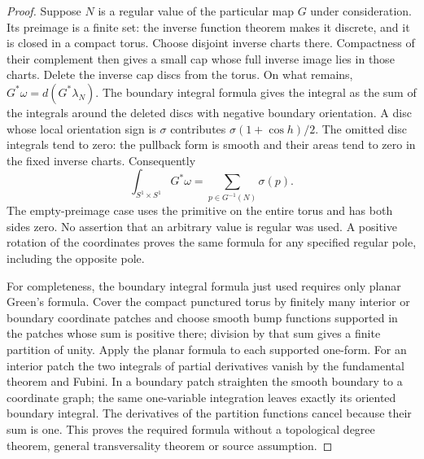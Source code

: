\begin{proof}
Suppose $N$ is a regular value of the particular map $G$ under
consideration. Its preimage is a finite set: the inverse function
theorem makes it discrete, and it is closed in a compact torus.
Choose disjoint inverse charts there. Compactness of their complement
then gives a small cap whose full inverse image lies in those charts.
Delete the inverse cap discs from the torus. On what remains,
$G^*\omega=d(G^*\lambda_N)$. The boundary integral formula gives
the integral as the sum of the integrals around the deleted discs
with negative boundary orientation. A disc whose local orientation
sign is $\sigma$ contributes $\sigma(1+\cos h)/2$.
The omitted disc integrals tend to zero: the pullback form is smooth
and their areas tend to zero in the fixed inverse charts. Consequently
\begin{equation}\label{fd:regular-pole-count}
                  \int_{S^1\times S^1}G^*\omega
                     =\sum_{p\in G^{-1}(N)}\sigma(p).
\end{equation}
The empty-preimage case uses the primitive on the entire torus and
has both sides zero. No assertion that an arbitrary value is regular
was used. A positive rotation of the coordinates proves the same
formula for any specified regular pole, including the opposite pole.

For completeness, the boundary integral formula just used requires
only planar Green's formula. Cover the compact punctured torus by
finitely many interior or boundary coordinate patches and choose
smooth bump functions supported in the patches whose sum is positive
there; division by that sum gives a finite partition of unity.
Apply the planar formula to each supported one-form. For an interior
patch the two integrals of partial derivatives vanish by the
fundamental theorem and Fubini. In a boundary patch straighten the
smooth boundary to a coordinate graph; the same one-variable
integration leaves exactly its oriented boundary integral.
The derivatives of the partition functions cancel because their sum
is one. This proves the required formula without a topological
degree theorem, general transversality theorem or source assumption.


\end{proof}
